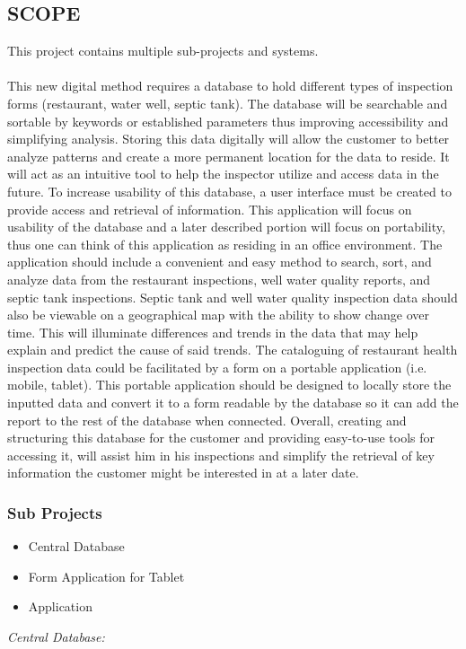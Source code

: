 \documentclass[twoside,letterpaper]{article}
\begin{document}
\subsection[PRODUCT SCOPE]{\rmfamily\bfseries\color{black}
SCOPE}
{\rmfamily\color{black}
This project contains multiple sub-projects and systems. 
\\		 \\
This new digital method requires a database to hold different types of inspection forms (restaurant, water well, septic tank). The database will be searchable and sortable by keywords or established parameters thus improving accessibility and simplifying analysis. Storing this data digitally will allow the customer to better analyze patterns and create a more permanent location for the data to reside. It will act as an intuitive tool to help the inspector utilize and access data in the future. To increase usability of this database, a user interface must be created to provide access and retrieval of information. This application will focus on usability of the database and a later described portion will focus on portability, thus one can think of this application as residing in an office environment. The application should include a convenient and easy method to search, sort, and analyze data from the restaurant inspections, well water quality reports, and septic tank inspections. Septic tank and well water quality inspection data should also be viewable on a geographical map with the ability to show change over time. This will illuminate differences and trends in the data that may help explain and predict the cause of said trends. The cataloguing of restaurant health inspection data could be facilitated by a form on a portable application (i.e. mobile, tablet). This portable application should be designed to locally store the inputted data and convert it to a form readable by the database so it can add the report to the rest of the database when connected. Overall, creating and structuring this database for the customer and providing easy-to-use tools for accessing it, will assist him in his inspections and simplify the retrieval of key information the customer might be interested in at a later date.
\subsubsection{Sub Projects}
\begin{itemize}
\item{Central Database}
\item{Form Application for Tablet}
\item{Application}
\end{itemize}
\textit{Central Database:}
\newline 

}
\end{document}
